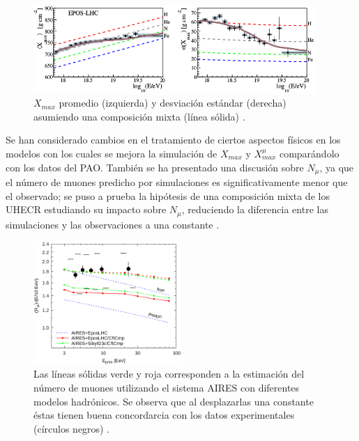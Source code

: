 \begin{figure}[h]
\centering
\includegraphics[width=0.95\textwidth]{Figuras/Xmax_PAO} 
\caption{$X_{max}$ promedio (izquierda) y desviación estándar (derecha) asumiendo una composición mixta (línea sólida) \cite{PAOcomposition}.}
\label{fig:Xmax}
\end{figure}	

Se han considerado cambios en el tratamiento de ciertos aspectos físicos en los modelos \cite{Ostapchenko2019} con los cuales se mejora la simulación de $X_{max}$ y $X_{max}^{\mu}$ comparándolo con los datos del PAO. También se ha presentado una discusión sobre $N_{\mu}$, ya que el número de muones predicho por simulaciones es significativamente menor que el observado; se puso a prueba la hipótesis de una composición mixta de los UHECR estudiando su impacto sobre $N_{\mu}$, reduciendo la diferencia entre las simulaciones y las observaciones a una constante \cite{Sciutto2019}. \\

\begin{figure}[h]
\centering
\includegraphics[width=0.5\textwidth]{Figuras/Nmu_Sciutto} 
\caption{Las líneas sólidas verde y roja corresponden a la estimación del número de muones utilizando el sistema AIRES con diferentes modelos hadrónicos. Se observa que al desplazarlas una constante éstas tienen buena concordarcia con los datos experimentales (círculos negros) \cite{Sciutto2019}.}
\label{fig:Nmu}
\end{figure}

